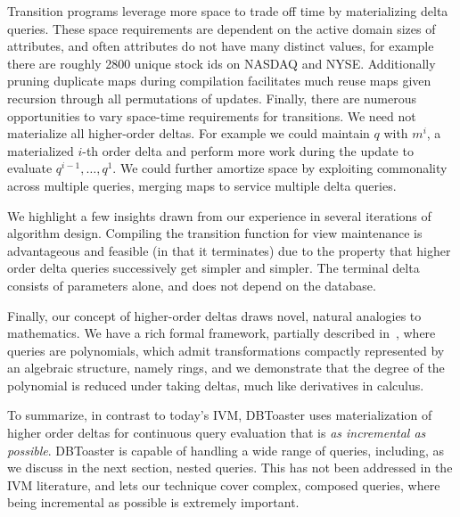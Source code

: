 Transition programs leverage more space to trade off time by materializing delta
queries. These space requirements are dependent on the active domain sizes of
attributes, and often attributes do not have many distinct values, for example
there are roughly 2800 unique stock ids on NASDAQ and NYSE. Additionally pruning
duplicate maps during compilation facilitates much reuse maps given recursion
through all permutations of updates. Finally, there are numerous opportunities
to vary space-time requirements for transitions. We need not materialize all
higher-order deltas. For example we could maintain $q$ with $m^i$, a
materialized $i$-th order delta and perform more work during the update to
evaluate $q^{i-1}, \ldots, q^1$. We could further amortize space by exploiting
commonality across multiple queries, merging maps to service multiple delta
queries.



 We highlight a few insights drawn from our experience in
several iterations of algorithm design. Compiling the transition function for
view maintenance is advantageous and feasible (in that it terminates) due to the
property that higher order delta queries successively get simpler and simpler.
The terminal delta consists of parameters alone, and does not depend on the
database.


Finally, our concept of higher-order deltas draws novel, natural analogies to
mathematics. We have a rich formal framework, partially described
in~\cite{koch-pods:10}, where queries are polynomials, which admit
transformations compactly represented by an algebraic structure, namely rings,
and we demonstrate that the degree of the polynomial is reduced under taking
deltas, much like derivatives in calculus.

To summarize, in contrast to today's IVM, DBToaster uses materialization of
higher order deltas for continuous query evaluation that is \textit{as
incremental as possible}. DBToaster is capable of handling a wide range of
queries, including, as we discuss in the next section, nested queries. This has
not been addressed in the IVM literature, and lets our technique
cover complex, composed queries, where being incremental as possible is
extremely important.

